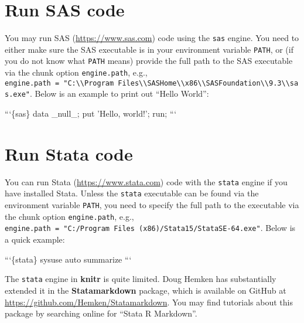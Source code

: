 \documentclass[
  11pt,
]{krantz}
\newenvironment{Shaded}{\begin{snugshade}}{\end{snugshade}}
\newcommand{\BaseNTok}[1]{\textcolor[rgb]{0.06,0.06,0.06}{#1}}
\begin{document}
\hypertarget{eng-sas}{%
\section{Run SAS code}\label{eng-sas}}

You may run SAS (\url{https://www.sas.com}) code using the \texttt{sas} engine. You need to either make sure the SAS executable is in your environment variable \texttt{PATH}, or (if you do not know what \texttt{PATH} means) provide the full path to the SAS executable via the chunk option \texttt{engine.path}, e.g., \texttt{engine.path\ =\ "C:\textbackslash{}\textbackslash{}Program\ Files\textbackslash{}\textbackslash{}SASHome\textbackslash{}\textbackslash{}x86\textbackslash{}\textbackslash{}SASFoundation\textbackslash{}\textbackslash{}9.3\textbackslash{}\textbackslash{}sas.exe"}. Below is an example to print out ``Hello World'':

\begin{Shaded}
\begin{Highlighting}[]
\BaseNTok{```\{sas\}}
\BaseNTok{data _null_;}
\BaseNTok{put 'Hello, world!';}
\BaseNTok{run;}
\BaseNTok{```}
\end{Highlighting}
\end{Shaded}

\hypertarget{eng-stata}{%
\section{Run Stata code}\label{eng-stata}}

You can run Stata (\url{https://www.stata.com}) code with the \texttt{stata} engine if you have installed Stata. Unless the \texttt{stata} executable can be found via the environment variable \texttt{PATH}, you need to specify the full path to the executable via the chunk option \texttt{engine.path}, e.g., \texttt{engine.path\ =\ "C:/Program\ Files\ (x86)/Stata15/StataSE-64.exe"}. Below is a quick example:

\begin{Shaded}
\begin{Highlighting}[]
\BaseNTok{```\{stata\}}
\BaseNTok{sysuse auto}
\BaseNTok{summarize}
\BaseNTok{```}
\end{Highlighting}
\end{Shaded}

The \texttt{stata} engine in \textbf{knitr} is quite limited. Doug Hemken has substantially extended it in the \textbf{Statamarkdown} package, which is available on GitHub at \url{https://github.com/Hemken/Statamarkdown}. You may find tutorials about this package by searching online for ``Stata R Markdown''.
\end{document}
